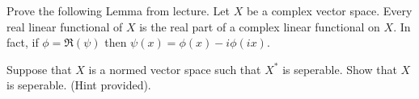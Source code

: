 \documentclass[12pt]{article}
\begin{document}
\begin{problem}{40}
    Prove the following Lemma from lecture. Let $X$ be a complex vector space. Every real linear functional of $X$ is the real part of a complex linear functional on $X$. In fact, if $\phi = \Re(\psi)$ then $\psi(x) = \phi(x) - i\phi(ix)$. 
\end{problem}
\begin{solution} 

\end{solution}
\newpage 

\begin{problem}{41}
    Suppose that $X$ is a normed vector space such that $X^*$ is seperable. Show that $X$ is seperable. (Hint provided).
\end{problem}
\begin{solution} 

\end{solution}
\newpage 
\end{document}
